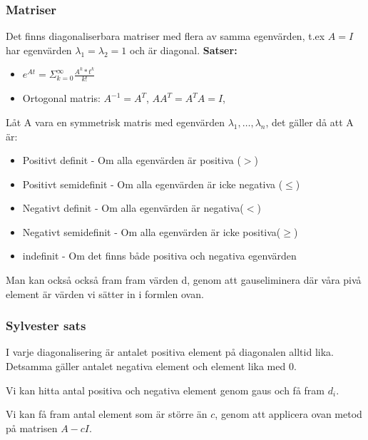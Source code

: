 \documentclass[twocolumn,a4paper]{article}
\begin{document}
\subsubsection*{Matriser}
Det finns diagonaliserbara matriser med flera av samma egenvärden, t.ex $A = I$ har egenvärden $\lambda_1 = \lambda_2 = 1$ och är diagonal.
\newline
\textbf{Satser:}
\begin{itemize}
    \item $e^{At} = \Sigma^{\infty}_{k=0} \frac{A^k*t^k}{k!}$
    \item Ortogonal matris: $A^{-1}=A^T$, $AA^T=A^TA=I$, %
    
\end{itemize}

Låt A vara en symmetrisk matris med egenvärden $\lambda_1, \ldots, \lambda_n$, det gäller då att A är:
\begin{itemize}
    \item Positivt definit - Om alla egenvärden är positiva ($>$)
    \item Positivt semidefinit - Om alla egenvärden är icke negativa ($\leq$)
    \item Negativt definit - Om alla egenvärden är negativa($<$)
    \item Negativt semidefinit - Om alla egenvärden är icke positiva($\geq$)
    \item indefinit - Om det finns både positiva och negativa egenvärden
    
\end{itemize}


Man kan också också fram fram värden d, genom att gauseliminera där våra pivå element är värden vi sätter in i formlen ovan.



\subsubsection*{Sylvester sats}
I varje diagonalisering är antalet positiva element på diagonalen alltid lika. Detsamma gäller antalet negativa element och element lika med 0.

Vi kan hitta antal positiva och negativa element genom gaus och få fram $d_i$. 

Vi kan få fram antal element som är större än $c$, genom att applicera ovan metod på matrisen $A-cI$.

   
\end{document}
